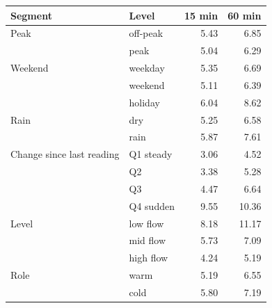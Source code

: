 \begin{tabular}{llrr}
\toprule
Segment & Level & 15 min & 60 min \\
\midrule
Peak & off-peak & 5.43 & 6.85 \\
 & peak & 5.04 & 6.29 \\
\midrule
Weekend & weekday & 5.35 & 6.69 \\
 & weekend & 5.11 & 6.39 \\
 & holiday & 6.04 & 8.62 \\
\midrule
Rain & dry & 5.25 & 6.58 \\
 & rain & 5.87 & 7.61 \\
\midrule
Change since last reading & Q1 steady & 3.06 & 4.52 \\
 & Q2 & 3.38 & 5.28 \\
 & Q3 & 4.47 & 6.64 \\
 & Q4 sudden & 9.55 & 10.36 \\
\midrule
Level & low flow & 8.18 & 11.17 \\
 & mid flow & 5.73 & 7.09 \\
 & high flow & 4.24 & 5.19 \\
\midrule
Role & warm & 5.19 & 6.55 \\
 & cold & 5.80 & 7.19 \\
\bottomrule
\end{tabular}
